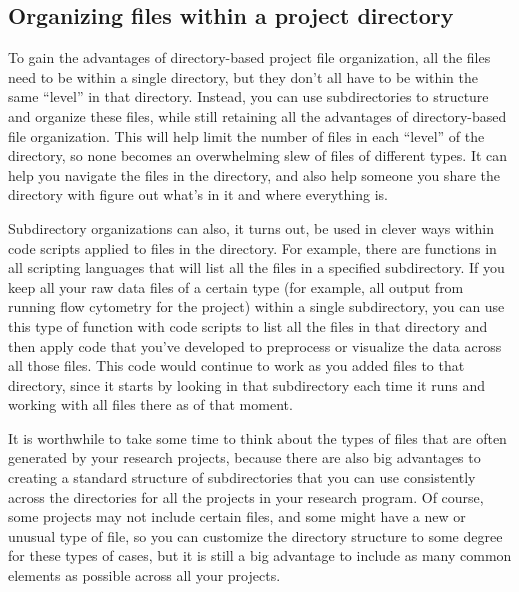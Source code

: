\documentclass[]{tufte-book}
\begin{document}
\hypertarget{organizing-files-within-a-project-directory}{%
\subsection{Organizing files within a project directory}\label{organizing-files-within-a-project-directory}}

To gain the advantages of directory-based project file organization, all the
files need to be within a single directory, but they don't all have to be within
the same ``level'' in that directory. Instead, you can use subdirectories to
structure and organize these files, while still retaining all the advantages of
directory-based file organization. This will help limit the number of files in
each ``level'' of the directory, so none becomes an overwhelming slew of files of
different types. It can help you navigate the files in the directory, and also
help someone you share the directory with figure out what's in it and where
everything is.

Subdirectory organizations can also, it turns out, be used in clever ways within
code scripts applied to files in the directory. For example, there are functions
in all scripting languages that will list all the files in a specified subdirectory.
If you keep all your raw data files of a certain type (for example, all output from
running flow cytometry for the project) within a single subdirectory, you can
use this type of function with code scripts to list all the files in that directory
and then apply code that you've developed to preprocess or visualize the data
across all those files. This code would continue to work as you added files to that
directory, since it starts by looking in that subdirectory each time it runs and
working with all files there as of that moment.

It is worthwhile to take some time to think about the types of files that are
often generated by your research projects, because there are also big advantages
to creating a standard structure of subdirectories that you can use consistently
across the directories for all the projects in your research program. Of course,
some projects may not include certain files, and some might have a new or unusual
type of file, so you can customize the directory structure to some degree for these
types of cases, but it is still a big advantage to include as many common elements
as possible across all your projects.
\end{document}
